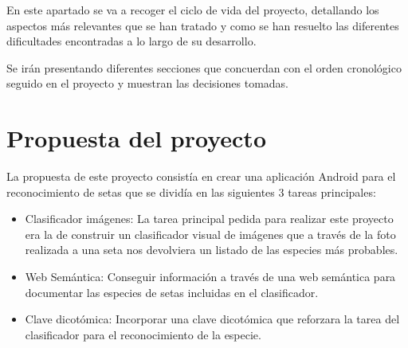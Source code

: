 

En este apartado se va a recoger el ciclo de vida del proyecto, detallando los aspectos más relevantes que se han tratado y como se han resuelto las diferentes  dificultades encontradas a lo largo de su desarrollo.

Se irán presentando diferentes secciones que concuerdan con el orden cronológico seguido en el proyecto y muestran las decisiones tomadas.

\section{Propuesta del proyecto}

La propuesta de este proyecto consistía en crear una aplicación Android para el reconocimiento de setas que se dividía en las siguientes 3 tareas principales:

\begin{itemize}
	\item{Clasificador imágenes:} La tarea principal pedida para realizar este proyecto era la de construir un clasificador visual de imágenes que a través de la foto realizada a una seta nos devolviera un listado de las especies más probables.
	\item{Web Semántica:} Conseguir información a través de una web semántica para documentar las especies de setas incluidas en el clasificador.
	\item{Clave dicotómica:} Incorporar una clave dicotómica que reforzara la tarea del clasificador para el reconocimiento de la especie.
\end{itemize}

